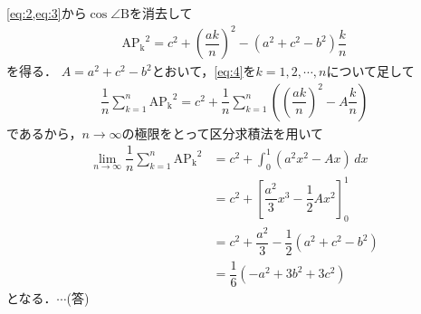 \documentclass[../../main.tex]{subfiles}
\begin{document}
\cref{eq:2,eq:3}から$\cos\angle\mathrm{B}$を消去して
\begin{align}
  \mathrm{AP_k}^2=c^2+\left(\dfrac{ak}{n}\right)^2-(a^2+c^2-b^2)\dfrac{k}{n} \label{eq:4}
\end{align}
を得る．
$A=a^2+c^2-b^2$とおいて，\cref{eq:4}を$k=1,2,\cdots,n$について足して
\begin{align}
  \dfrac{1}{n}\sum_{k=1}^n\mathrm{AP_k}^2
  =c^2+\dfrac{1}{n}\sum_{k=1}^n\left(\left(\dfrac{ak}{n}\right)^2-A\dfrac{k}{n}\right)
\end{align}
であるから，$n\to\infty$の極限をとって区分求積法を用いて
\begin{align}
  \lim_{n\to\infty}\dfrac{1}{n}\sum_{k=1}^n\mathrm{AP_k}^2&= %
  c^2+\int_0^1(a^2x^2-Ax)\, dx \\
  &=c^2+\left[\dfrac{a^2}{3}x^3-\dfrac{1}{2}Ax^2\right]_{0}^{1} \\
  &=c^2+\dfrac{a^2}{3}-\dfrac{1}{2}(a^2+c^2-b^2) \\
  &=\dfrac{1}{6}(-a^2+3b^2+3c^2)
\end{align}
となる．$\cdots$(答)
\newpage
\end{document}

